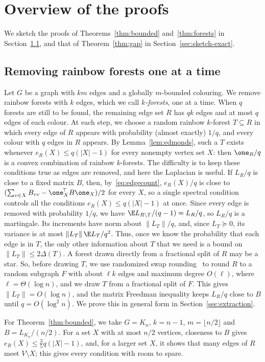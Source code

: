 \section{Overview of the proofs}\label{sec:overview}
We sketch the proofs of Theorems~\ref{thm:bounded} and~\ref{thm:forests} in Section~\ref{sec:sketch-extract}, and that of Theorem~\ref{thm:gap} in Section~\ref{sec:sketch-exact}.

\subsection{Removing rainbow forests one at a time}\label{sec:sketch-extract}
Let $G$ be a graph with $km$ edges and a globally $m$-bounded colouring. We remove rainbow forests with $k$ edges, which we call \emph{$k$-forests}, one at a time.
When $q$ forests are still to be found, the remaining edge set $R$ has $qk$ edges and at most $q$ edges of each colour.
At each step, we choose a random rainbow $k$-forest $T\subseteq R$ in which every edge of $R$ appears with probability (almost exactly) $1/q$, and every colour with $q$ edges in $R$ appears.
By Lemma~\ref{lem:edmonds}, such a $T$ exists whenever $e_R(X)\le q(|X|-1)$ for every nonempty vertex set $X$: then $\one_R/q$ is a convex combination of rainbow $k$-forests.
The difficulty is to keep these conditions true as edges are removed, and here the Laplacian is useful.
If $L_R/q$ is close to a fixed matrix $B$, then, by~\eqref{eq:edgecount}, $e_R(X)/q$ is close to $(\sum_{v\in X}B_{vv}-\one_X^{\!\top}B\one_X)/2$ for every $X$, so a single spectral condition controls all the conditions $e_R(X)\le q(|X|-1)$ at once.
Since every edge is removed with probability $1/q$, we have $\E L_{R\setminus T}/(q-1)=L_R/q$, so $L_R/q$ is a martingale.
Its increments have norm about $\|L_T\|/q$, and, since $L_T\succeq0$, its variance is at most $\|L_T\|\,\E L_T/q^2$.
Thus, once we know the probability that each edge is in $T$, the only other information about $T$ that we need is a bound on $\|L_T\|\le2\Delta(T)$.
A forest drawn directly from a fractional split of $R$ may be a star.
So, before drawing $T$, we use randomized swap rounding~\cite{CVZ} to round $R$ to a random subgraph $F$ with about $\ell k$ edges and maximum degree $O(\ell)$, where $\ell=\Theta(\log n)$, and we draw $T$ from a fractional split of $F$.
This gives $\|L_T\|=O(\log n)$, and the matrix Freedman inequality keeps $L_R/q$ close to $B$ until $q=O(\log^2n)$.
We prove this in general form in Section~\ref{sec:extraction}.

For Theorem~\ref{thm:bounded}, we take $G=K_n$, $k=n-1$, $m=\lfloor n/2\rfloor$ and $B=L_{K_n}/(n/2)$.
For a set $X$ with at most $n/2$ vertices, closeness to $B$ gives $e_R(X)\le\frac35q(|X|-1)$, and, for a larger set $X$, it shows that many edges of $R$ meet $V\setminus X$; this gives every condition with room to spare.

